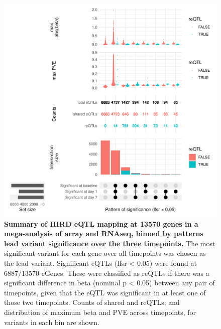 \begin{figure}
    \centering
    \includegraphics[width=1.0\textwidth]{mainmatter/figures/chapter_03/compare_dge_eqtl.upset.pdf}
    \caption{
        \textbf{Summary of HIRD eQTL mapping at 13570 genes in a mega-analysis of array and RNAseq, binned by patterns lead variant significance over the three timepoints.}
        The most significant variant for each gene over all timepoints was chosen as the lead variant.
        Significant eQTLs (lfsr < 0.05) were found at \num{6887/13570} eGenes.
        These were classified as reQTLs if there was a significant difference in beta (nominal p < 0.05) between any pair of timepoints,
        given that the eQTL was significant in at least one of those two timepoints.
        Counts of shared and reQTLs; and distribution of maximum beta and \gls{PVE} across timepoints, for variants in each bin are shown.
    }
    \label{fig:hird_eQTL_upset_mega}
\end{figure}

